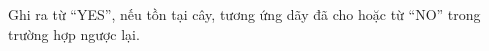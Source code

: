 Ghi ra từ “YES”, nếu tồn tại cây, tương ứng dãy đã cho hoặc từ “NO” trong trường hợp ngược lại.  

\